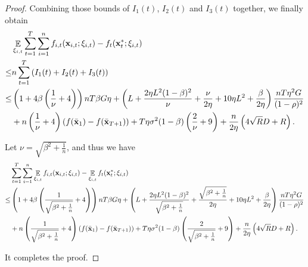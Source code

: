 \documentclass{article}
\begin{document}
\begin{proof}
Combining those bounds of $I_1(t)$, $I_2(t)$ and $I_3(t)$ together, we finally obtain
\begin{align}
\nonumber
& \mathop{\mathbb{E}}_{\xi_{i,t}} \sum_{t=1}^T\sum_{i=1}^n f_{i,t}({\bf x}_{i,t};\xi_{i,t}) - f_t({\bf x}_t^\ast;\xi_{i,t}) \\ \nonumber
\le & n \sum_{t=1}^T \left(  I_1(t) + I_2(t) + I_3(t)  \right) \\ \nonumber
\le & \left( 1 + 4\beta\left( \frac{1}{\nu}+4 \right) \right)nT\beta G \eta + \left(  L + \frac{2\eta L^2(1-\beta)^2}{\nu} + \frac{\nu}{2\eta} + 10\eta L^2  + \frac{\beta}{2\eta}  \right) \frac{nT \eta^2 G}{(1-\rho)^2} \\ \nonumber 
&+ n\left( \frac{1}{\nu} + 4 \right)\left( f(\bar{{\bf x}}_1) - f(\bar{{\bf x}}_{T+1}) \right) + T\eta \sigma^2 (1-\beta)\left( \frac{2}{\nu}+9 \right)   + \frac{n}{2\eta}\left(  4\sqrt{R}D + R   \right).
\end{align} 

Let $\nu = \sqrt{\beta^2 + \frac{1}{n}} $, and thus we have
\begin{align}
\nonumber
&\sum_{t=1}^T\sum_{i=1}^n \mathop{\mathbb{E}}_{\xi_{i,t}} f_{i,t}({\bf x}_{i,t};\xi_{i,t}) - \mathop{\mathbb{E}}_{\xi_{i,t}} f_t({\bf x}_t^\ast;\xi_{i,t}) \\ \nonumber
\le & \left( 1 + 4\beta\left( \frac{1}{\sqrt{\beta^2 + \frac{1}{n}}}+4 \right) \right)nT\beta G \eta + \left(  L + \frac{2\eta L^2(1-\beta)^2}{\sqrt{\beta^2 + \frac{1}{n}}} + \frac{\sqrt{\beta^2 + \frac{1}{n}}}{2\eta} + 10\eta L^2  + \frac{\beta}{2\eta}  \right) \frac{nT \eta^2 G}{(1-\rho)^2} \\ \nonumber 
&+ n\left( \frac{1}{\sqrt{\beta^2 + \frac{1}{n}}} + 4 \right)\left( f(\bar{{\bf x}}_1) - f(\bar{{\bf x}}_{T+1}) \right) + T\eta \sigma^2 (1-\beta)\left( \frac{2}{\sqrt{\beta^2 + \frac{1}{n}}}+9 \right)   + \frac{n}{2\eta}\left(  4\sqrt{R}D + R   \right).
\end{align}





It completes the proof.









\end{proof}
\end{document}
